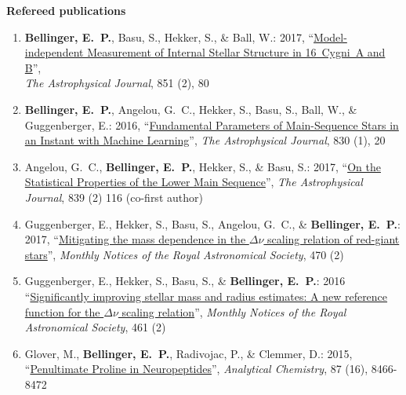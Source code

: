 {\bf\large Refereed publications}\\
\begin{enumerate}
    \item \textbf{Bellinger, E.~P.}, Basu, S., Hekker, S., \& Ball, W.: 2017, 
    ``\href{http://adsabs.harvard.edu/abs/2017ApJ...851...80B}{Model-independent Measurement of Internal Stellar Structure in 16~Cygni~A and B}'', 
    \\\emph{The Astrophysical Journal}, 851 (2), 80 
    
    \item \textbf{Bellinger, E.~P.}, Angelou, G.~C., Hekker, S., Basu, S., Ball, W., \& Guggenberger, E.: 2016, 
    ``\href{http://adsabs.harvard.edu/abs/2016ApJ...830...31B}{Fundamental Parameters of Main-Sequence Stars in an Instant with Machine Learning}'', 
    \emph{The Astrophysical Journal}, 830 (1), 20  
    
    \item Angelou, G.~C., \textbf{Bellinger, E.~P.}, Hekker, S., \& Basu, S.: 2017,
    ``\href{http://adsabs.harvard.edu/abs/2017ApJ...839..116A}{On the Statistical Properties of the Lower Main Sequence}'', 
    \emph{The Astrophysical Journal}, 839 (2) 116 (co-first author) 
    
    \item Guggenberger, E., Hekker, S., Basu, S., Angelou, G.~C., \& \textbf{Bellinger, E.~P.}: 2017, 
    ``\href{http://adsabs.harvard.edu/abs/2017MNRAS.470.2069G}{Mitigating the mass dependence in the $\Delta\nu$ scaling relation of red-giant stars}'',
    \emph{Monthly Notices of the Royal Astronomical Society}, 470 (2)%
    
    \item Guggenberger, E., Hekker, S., Basu, S., \& \textbf{Bellinger, E.~P.}: 2016
    ``\href{http://adsabs.harvard.edu/abs/2016MNRAS.460.4277G}{Significantly improving stellar mass and radius estimates: A new reference function for the $\Delta\nu$ scaling relation}'', 
    \emph{Monthly Notices of the Royal Astronomical Society}, 461 (2)%
    
    \item Glover, M., \textbf{Bellinger, E.~P.}, Radivojac, P., \& Clemmer, D.: 2015, 
    ``\href{https://www.ncbi.nlm.nih.gov/pubmed/26192015}{Penultimate Proline in Neuropeptides}'',
    \emph{Analytical Chemistry}, 87 (16), 8466-8472 %
    

\end{enumerate}
